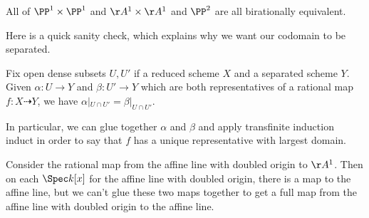 \documentclass[../notes.tex]{subfiles}
\begin{document}
\begin{example}
	All of $\PP^1\times\PP^1$ and $\AA^1\times\AA^1$ and $\PP^2$ are all birationally equivalent.
\end{example}
Here is a quick sanity check, which explains why we want our codomain to be separated.
\begin{proposition}
	Fix open dense subsets $U,U'$ if a reduced scheme $X$ and a separated scheme $Y$. Given $\alpha\colon U\to Y$ and $\beta\colon U'\to Y$ which are both representatives of a rational map $f\colon X\dashrightarrow Y$, we have $\alpha|_{U\cap U'}=\beta|_{U\cap U'}$.
\end{proposition}
In particular, we can glue together $\alpha$ and $\beta$ and apply transfinite induction induct in order to say that $f$ has a unique representative with largest domain.
\begin{nex}
	Consider the rational map from the affine line with doubled origin to $\AA^1$. Then on each $\Spec k[x]$ for the affine line with doubled origin, there is a map to the affine line, but we can't glue these two maps together to get a full map from the affine line with doubled origin to the affine line.
\end{nex}
\end{document}

